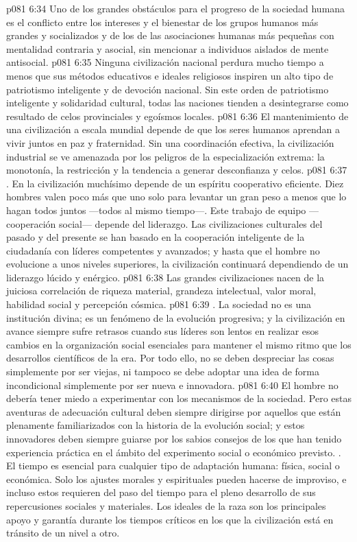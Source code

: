 \vs p081 6:34  Uno de los grandes obstáculos para el progreso de la sociedad humana es el conflicto entre los intereses y el bienestar de los grupos humanos más grandes y socializados y de los de las asociaciones humanas más pequeñas con mentalidad contraria y asocial, sin mencionar a individuos aislados de mente antisocial.
\vs p081 6:35 Ninguna civilización nacional perdura mucho tiempo a menos que sus métodos educativos e ideales religiosos inspiren un alto tipo de patriotismo inteligente y de devoción nacional. Sin este orden de patriotismo inteligente y solidaridad cultural, todas las naciones tienden a desintegrarse como resultado de celos provinciales y egoísmos locales.
\vs p081 6:36 El mantenimiento de una civilización a escala mundial depende de que los seres humanos aprendan a vivir juntos en paz y fraternidad. Sin una coordinación efectiva, la civilización industrial se ve amenazada por los peligros de la especialización extrema: la monotonía, la restricción y la tendencia a generar desconfianza y celos.
\vs p081 6:37 . En la civilización muchísimo depende de un espíritu cooperativo eficiente. Diez hombres valen poco más que uno solo para levantar un gran peso a menos que lo hagan todos juntos ---todos al mismo tiempo---. Este trabajo de equipo ---cooperación social--- depende del liderazgo. Las civilizaciones culturales del pasado y del presente se han basado en la cooperación inteligente de la ciudadanía con líderes competentes y avanzados; y hasta que el hombre no evolucione a unos niveles superiores, la civilización continuará dependiendo de un liderazgo lúcido y enérgico.
\vs p081 6:38 Las grandes civilizaciones nacen de la juiciosa correlación de riqueza material, grandeza intelectual, valor moral, habilidad social y percepción cósmica.
\vs p081 6:39 . La sociedad no es una institución divina; es un fenómeno de la evolución progresiva; y la civilización en avance siempre sufre retrasos cuando sus líderes son lentos en realizar esos cambios en la organización social esenciales para mantener el mismo ritmo que los desarrollos científicos de la era. Por todo ello, no se deben despreciar las cosas simplemente por ser viejas, ni tampoco se debe adoptar una idea de forma incondicional simplemente por ser nueva e innovadora.
\vs p081 6:40 El hombre no debería tener miedo a experimentar con los mecanismos de la sociedad. Pero estas aventuras de adecuación cultural deben siempre dirigirse por aquellos que están plenamente familiarizados con la historia de la evolución social; y estos innovadores deben siempre guiarse por los sabios consejos de los que han tenido experiencia práctica en el ámbito del experimento social o económico previsto. . El tiempo es esencial para cualquier tipo de adaptación humana: física, social o económica. Solo los ajustes morales y espirituales pueden hacerse de improviso, e incluso estos requieren del paso del tiempo para el pleno desarrollo de sus repercusiones sociales y materiales. Los ideales de la raza son los principales apoyo y garantía durante los tiempos críticos en los que la civilización está en tránsito de un nivel a otro.
